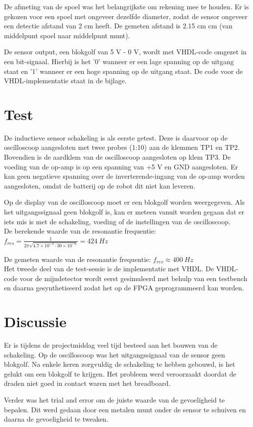 \documentclass{report}
\begin{document}
De afmeting van de spoel was het belangrijkste om rekening mee te houden. Er is gekozen voor een spoel met ongeveer dezelfde diameter, zodat de sensor ongeveer een detectie afstand van 2 cm heeft. De gemeten afstand is 2.15 cm  cm (van middelpunt spoel naar middelpunt munt).

De sensor output, een blokgolf van 5 V - 0 V, wordt met VHDL-code omgezet in een bit-signaal. Hierbij is het '0' wanneer er een lage spanning op de uitgang staat en '1' wanneer er een hoge spanning op de uitgang staat. De code voor de VHDL-implementatie staat in de bijlage.

\section{Test}
De inductieve sensor schakeling is als eerste getest. Deze is daarvoor op de oscilloscoop aangesloten met twee probes (1:10) aan de klemmen TP1 en TP2. Bovendien is de aardklem van de oscilloscoop aangesloten op klem TP3. De voeding van de op-amp is op een spanning van +5 V en GND aangesloten. Er kan geen negatieve spanning over de inverterende-ingang van de op-amp worden aangesloten, omdat de batterij op de robot dit niet kan leveren. 

Op de display van de oscilloscoop moet er een blokgolf worden weergegeven. Als het uitgangssignaal geen blokgolf is, kan er meteen vanuit worden gegaan dat er iets mis is met de schakeling, voeding of de instellingen van de oscilloscoop.\\
De berekende waarde van de resonantie frequentie:
$f_{res}=\frac{1}{2\pi \sqrt{4.7\times 10^{-3}\cdot 30\times 10^{-6}}}= 424 \:Hz$

\noindent De gemeten waarde van de resonantie frequentie:
$f_{res}\approx400\:Hz$\\

\noindent Het tweede deel van de test-sessie is de implementatie met VHDL. De VHDL-code voor de mijndetector wordt eerst gesimuleerd met behulp van een testbench en daarna gesynthetiseerd zodat het op de FPGA geprogrammeerd kan worden. 

\section{Discussie}
Er is tijdens de projectmiddag veel tijd besteed aan het bouwen van de schakeling. Op de oscilloscoop was het uitgangssignaal van de sensor geen blokgolf. Na enkele keren zorgvuldig de schakeling te hebben gebouwd, is het gelukt om een blokgolf te krijgen. Het probleem werd veroorzaakt doordat de draden niet goed in contact waren met het breadboard.

Verder was het trial and error om de juiste waarde van de gevoeligheid te bepalen. Dit werd gedaan door een metalen munt onder de sensor te schuiven en daarna de gevoeligheid te tweaken.
\end{document}
